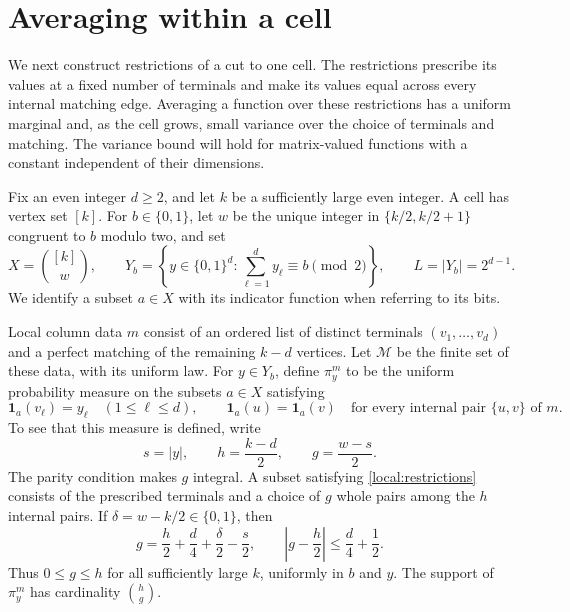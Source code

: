 \section{Averaging within a cell}
\label{sec:local}

We next construct restrictions of a cut to one cell.  The restrictions
prescribe its values at a fixed number of terminals and make its values
equal across every internal matching edge.  Averaging a function over
these restrictions has a uniform marginal and, as the cell grows, small
variance over the choice of terminals and matching.  The variance bound
will hold for matrix-valued functions with a constant independent of their
dimensions.

Fix an even integer $d\ge 2$, and let $k$ be a sufficiently large even
integer.  A cell has vertex set $[k]$.  For $b\in\{0,1\}$, let $w$ be the
unique integer in $\{k/2,k/2+1\}$ congruent to $b$ modulo two, and set
\[
  X=\binom{[k]}{w},
  \qquad
  Y_b=\left\{y\in\{0,1\}^d:
       \sum_{\ell=1}^d y_\ell\equiv b\pmod 2\right\},
  \qquad L=|Y_b|=2^{d-1}.
\]
We identify a subset $a\in X$ with its indicator function when referring
to its bits.

Local column data $m$ consist of an ordered list of distinct terminals
$(v_1,\ldots,v_d)$ and a perfect matching of the remaining $k-d$ vertices.
Let $\mathcal M$ be the finite set of these data, with its uniform law.
For $y\in Y_b$, define $\pi_y^m$ to be the uniform probability measure on
the subsets $a\in X$ satisfying
\begin{equation}
  \mathbf 1_a(v_\ell)=y_\ell\quad(1\le\ell\le d),
  \qquad
  \mathbf 1_a(u)=\mathbf 1_a(v)
       \quad\text{for every internal pair }\{u,v\}\text{ of }m.
  \label{local:restrictions}
\end{equation}
To see that this measure is defined, write
\begin{equation}
  s=|y|,\qquad h=\frac{k-d}{2},\qquad
  g=\frac{w-s}{2}.
  \label{local:parameters}
\end{equation}
The parity condition makes $g$ integral.  A subset satisfying
\eqref{local:restrictions} consists of the prescribed terminals and a
choice of $g$ whole pairs among the $h$ internal pairs.  If
$\delta=w-k/2\in\{0,1\}$, then
\begin{equation}
  g=\frac h2+\frac d4+\frac\delta2-\frac s2,
  \qquad
  \left|g-\frac h2\right|\le\frac d4+\frac12.
  \label{local:central}
\end{equation}
Thus $0\le g\le h$ for all sufficiently large $k$, uniformly in $b$ and
$y$.  The support of $\pi_y^m$ has cardinality $\binom hg$.

